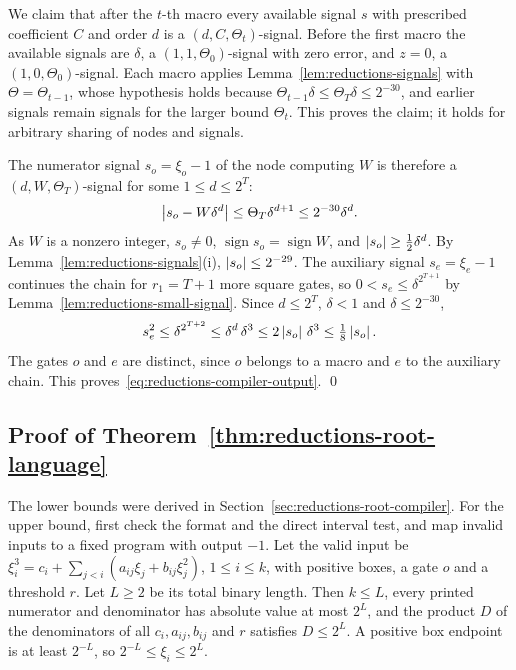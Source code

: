 We claim that after the $t$-th macro every available signal $s$ with prescribed
coefficient $C$ and order $d$ is a $(d,C,\Theta_t)$-signal. Before the first
macro the available signals are $\delta$, a $(1,1,\Theta_0)$-signal with zero
error, and $z=0$, a $(1,0,\Theta_0)$-signal. Each macro applies
Lemma~\ref{lem:reductions-signals} with $\Theta=\Theta_{t-1}$, whose hypothesis
holds because $\Theta_{t-1}\delta\le\Theta_T\delta\le2^{-30}$, and earlier signals
remain signals for the larger bound $\Theta_t$. This proves the claim; it holds
for arbitrary sharing of nodes and signals.

The numerator signal $s_o=\xi_o-1$ of the node computing $W$ is therefore a
$(d,W,\Theta_T)$-signal for some $1\le d\le2^T$:
\[
 \left\lvert s_o-W\delta^d\right\rvert\le\Theta_T\delta^{d+1}\le2^{-30}\delta^d.
\]
As $W$ is a nonzero integer, $s_o\ne0$, $\operatorname{sign}s_o=\operatorname{sign}W$,
and $\left\lvert s_o\right\rvert\ge\frac12\delta^d$. By Lemma~\ref{lem:reductions-signals}(i),
$\left\lvert s_o\right\rvert\le2^{-29}$. The auxiliary signal $s_e=\xi_e-1$ continues the chain
for $r_1=T+1$ more square gates, so $0<s_e\le\delta^{2^{T+1}}$ by
Lemma~\ref{lem:reductions-small-signal}. Since $d\le2^T$, $\delta<1$ and
$\delta\le2^{-30}$,
\[
 s_e^2\le\delta^{2^{T+2}}\le\delta^{d}\,\delta^{3}\le2\left\lvert s_o\right\rvert\,\delta^3
 \le\tfrac18\left\lvert s_o\right\rvert.
\]
The gates $o$ and $e$ are distinct, since $o$ belongs to a macro and $e$ to the
auxiliary chain. This proves~\eqref{eq:reductions-compiler-output}. \qed

\subsection{Proof of Theorem~\ref{thm:reductions-root-language}}
\label{app:reductions-root-language}

The lower bounds were derived in Section~\ref{sec:reductions-root-compiler}.
For the upper bound, first check the format and the direct interval test, and
map invalid inputs to a fixed program with output $-1$. Let the valid input be
$\xi_i^3=c_i+\sum_{j<i}(a_{ij}\xi_j+b_{ij}\xi_j^2)$, $1\le i\le k$, with positive
boxes, a gate $o$ and a threshold $r$. Let $L\ge2$ be its total binary length.
Then $k\le L$, every printed numerator and denominator has absolute value at
most $2^L$, and the product $D$ of the denominators of all $c_i,a_{ij},b_{ij}$
and $r$ satisfies $D\le2^L$. A positive box endpoint is at least $2^{-L}$, so
$2^{-L}\le\xi_i\le2^L$.

